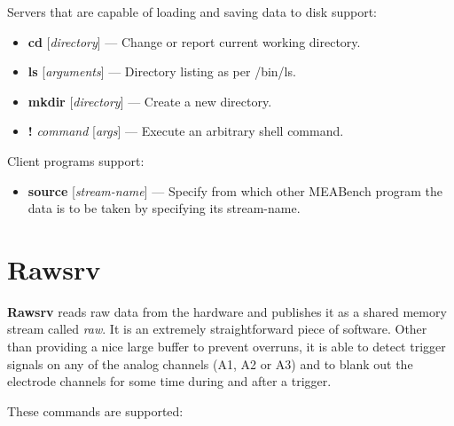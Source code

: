 \documentclass[12pt,oneside]{book}
\def\meabench{{MEABench}\xspace}
\def\prog#1{{\bf #1}}
\def\cmd#1{{\bf #1}}
\def\arg#1{{\it #1}}
\def\stream#1{{\it #1}\xspace}
\def\streamtype#1{{\sc #1}\xspace}
\def\raw{\streamtype{raw}}
\begin{document}
Servers that are capable of loading and saving data to disk  support:

\begin{itemize}
\item \cmd{cd} [\arg{directory}] --- Change or report current working
directory.

\item \cmd{ls} [\arg{arguments}] --- Directory listing as per /bin/ls.

\item \cmd{mkdir} [\arg{directory}] --- Create a new directory.

\item \cmd{!} \arg{command} [\arg{args}] --- Execute an arbitrary shell command.

\end{itemize}

Client programs support:

\begin{itemize}
\item \cmd{source} [\arg{stream-name}] --- Specify from which
other \meabench program the data is to be taken by specifying its
stream-name.
\end{itemize}


\section{Rawsrv}

\prog{Rawsrv} reads \raw data from the hardware and publishes it as a
shared memory stream called \stream{raw}. It is an extremely
straightforward piece of software. Other than providing a nice large
buffer to prevent overruns, it is able to detect trigger signals on
any of the analog channels (A1, A2 or A3) and to blank out the
electrode channels for some time during and after a trigger.

These commands are supported:
\end{document}
